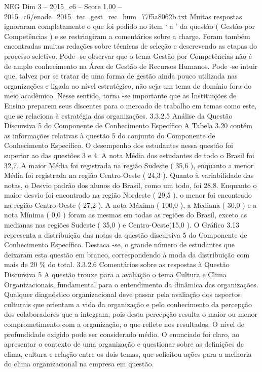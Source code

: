 \begin{textsample}{NEG Dim 3 – 2015\_c6 – Score 1.00 – 2015\_c6/enade\_2015\_tec\_gest\_rec\_hum\_77f5a8062b.txt}
Muitas respostas ignoraram completamente o que foi pedido no item ‘ a ’ da questão ( Gestão por Competências ) e se restringiram a comentários sobre a charge.
Foram também encontradas muitas redações sobre técnicas de seleção e descrevendo as etapas do processo seletivo.
Pode -se observar que o tema Gestão por Competências não é de amplo conhecimento na Área de Gestão de Recursos Humanos.
Pode -se intuir que, talvez por se tratar de uma forma de gestão ainda pouco utilizada nas organizações e ligada ao nível estratégico, não seja um tema de domínio fora do meio acadêmico.
Nesse sentido, torna -se importante que as Instituições de Ensino preparem seus discentes para o mercado de trabalho em temas como este, que se relaciona à estratégia das organizações. 3.3.2.5 Análise da Questão Discursiva 5 do Componente de Conhecimento Específico A Tabela 3.20 contém as informações relativas à questão 5 do conjunto do Componente de Conhecimento Específico.
O desempenho dos estudantes nessa questão foi superior ao das questões 3 e 4.
A nota Média dos estudantes de todo o Brasil foi 32,7.
A maior Média foi registrada na região Sudeste ( 35,6 ), enquanto a menor Média foi registrada na região Centro-Oeste ( 24,3 ).
Quanto à variabilidade das notas, o Desvio padrão dos alunos do Brasil, como um todo, foi 28,8.
Enquanto o maior desvio foi encontrado na região Nordeste ( 29,5 ), o menor foi encontrado na região Centro-Oeste ( 27,2 ).
A nota Máxima ( 100,0 ), a Mediana ( 30,0 ) e a nota Mínima ( 0,0 ) foram as mesmas em todas as regiões do Brasil, exceto as medianas nas regiões Sudeste ( 35,0 ) e Centro-Oeste(15,0 ).
O Gráfico 3.13 representa a distribuição das notas da questão discursiva 5 do Componente de Conhecimento Específico.
Destaca -se, o grande número de estudantes que deixaram esta questão em branco, correspondendo à moda da distribuição com mais de 20 \% do total. 3.3.2.6 Comentários sobre as respostas à Questão Discursiva 5 A questão trouxe para a avaliação o tema Cultura e Clima Organizacionais, fundamental para o entendimento da dinâmica das organizações.
Qualquer diagnóstico organizacional deve passar pela avaliação dos aspectos culturais que orientam a vida da organização e pelo conhecimento da percepção dos colaboradores que a integram, pois desta percepção resulta o maior ou menor comprometimento com a organização, o que reflete nos resultados.
O nível de profundidade exigido pode ser considerado médio.
O enunciado foi claro, ao apresentar o contexto de uma organização e questionar sobre as definições de clima, cultura e relação entre os dois temas, que solicitou ações para a melhoria do clima organizacional na empresa em questão.

\end{textsample}
